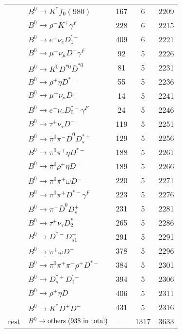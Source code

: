 \documentclass[landscape]{article}
\newcounter{rownumbers}
\newcommand\rn{\stepcounter{rownumbers}\arabic{rownumbers}}
\newcommand{\EOL}{\\} %
\newcommand{\topoTags}[1]{#1} %
\begin{document}
\begin{longtable}{clccc}
\rn & $ B^{0} \rightarrow K^{*} f_{0}(980) $ & \topoTags{167 & }6 & 2209 \EOL

\rn & $ B^{0} \rightarrow \rho^{-} K^{+} \gamma^{F} $ & \topoTags{228 & }6 & 2215 \EOL

\rn & $ B^{0} \rightarrow e^{+} \nu_{e} D_{1}^{\prime-} $ & \topoTags{409 & }6 & 2221 \EOL

\rn & $ B^{0} \rightarrow \mu^{+} \nu_{\mu} D^{-} \gamma^{F} $ & \topoTags{92 & }5 & 2226 \EOL

\rn & $ B^{0} \rightarrow K^{0} D^{*0} \bar{D}^{*0} $ & \topoTags{81 & }5 & 2231 \EOL

\rn & $ B^{0} \rightarrow \rho^{+} \eta D^{*-} $ & \topoTags{55 & }5 & 2236 \EOL

\rn & $ B^{0} \rightarrow \mu^{+} \nu_{\mu} D_{1}^{-} $ & \topoTags{14 & }5 & 2241 \EOL

\rn & $ B^{0} \rightarrow e^{+} \nu_{e} D_{0}^{*-} \gamma^{F} $ & \topoTags{24 & }5 & 2246 \EOL

\rn & $ B^{0} \rightarrow \tau^{+} \nu_{\tau} D^{-} $ & \topoTags{119 & }5 & 2251 \EOL

\rn & $ B^{0} \rightarrow \pi^{0} \pi^{-} \bar{D}^{0} D_{s}^{*+} $ & \topoTags{129 & }5 & 2256 \EOL

\rn & $ B^{0} \rightarrow \pi^{0} \pi^{+} \eta D^{*-} $ & \topoTags{188 & }5 & 2261 \EOL

\rn & $ B^{0} \rightarrow \pi^{0} \rho^{+} \eta D^{-} $ & \topoTags{189 & }5 & 2266 \EOL

\rn & $ B^{0} \rightarrow \pi^{0} \pi^{+} \omega D^{-} $ & \topoTags{220 & }5 & 2271 \EOL

\rn & $ B^{0} \rightarrow \pi^{0} \pi^{+} D^{*-} \gamma^{F} $ & \topoTags{223 & }5 & 2276 \EOL

\rn & $ B^{0} \rightarrow \pi^{-} \bar{D}^{0} D_{s}^{+} $ & \topoTags{231 & }5 & 2281 \EOL

\rn & $ B^{0} \rightarrow \tau^{+} \nu_{\tau} D_{2}^{*-} $ & \topoTags{265 & }5 & 2286 \EOL

\rn & $ B^{0} \rightarrow D^{*-} D_{s1}^{+} $ & \topoTags{291 & }5 & 2291 \EOL

\rn & $ B^{0} \rightarrow \pi^{+} \omega D^{-} $ & \topoTags{378 & }5 & 2296 \EOL

\rn & $ B^{0} \rightarrow \pi^{0} \pi^{+} \pi^{-} \rho^{+} D^{*-} $ & \topoTags{384 & }5 & 2301 \EOL

\rn & $ B^{0} \rightarrow D_{s}^{*+} D_{1}^{\prime-} $ & \topoTags{394 & }5 & 2306 \EOL

\rn & $ B^{0} \rightarrow \rho^{+} \eta D^{-} $ & \topoTags{406 & }5 & 2311 \EOL

\rn & $ B^{0} \rightarrow K^{*} D^{+} D^{-} $ & \topoTags{431 & }5 & 2316 \EOL

rest & $ B^{0} \rightarrow \rm{others \  (938 \  in \  total)} $ & \topoTags{--- & }1317 & 3633 \\ \hline

\end{longtable}
\end{document}
